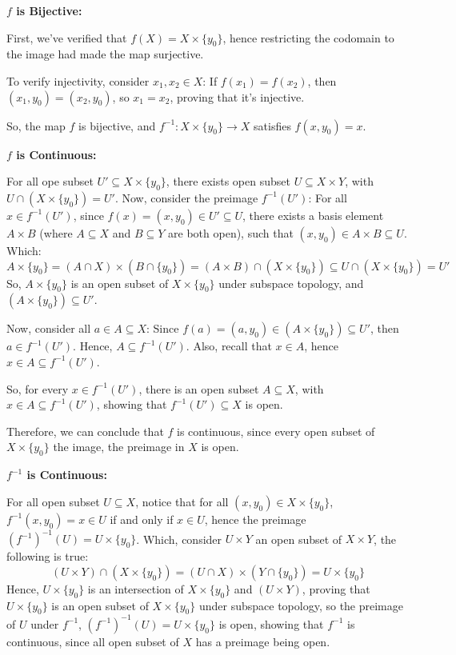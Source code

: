 \documentclass{article}
\begin{document}
\hfill

\textbf{$f$ is Bijective:}

First, we've verified that $f(X)=X\times \{y_0\}$, hence restricting the codomain to the image had made the map surjective.

To verify injectivity, consider $x_1,x_2 \in X$: If $f(x_1)=f(x_2)$, then $(x_1,y_0)=(x_2,y_0)$, so $x_1=x_2$, proving that it's injective.

So, the map $f$ is bijective, and $f^{-1}:X\times \{y_0\}\rightarrow X$ satisfies $f(x,y_0)=x$.

\hfill

\textbf{$f$ is Continuous:}

For all ope subset $U'\subseteq X\times \{y_0\}$, there exists open subset $U\subseteq X\times Y$, with $U\cap (X\times \{y_0\}) = U'$.
Now, consider the preimage $f^{-1}(U')$: For all $x\in f^{-1}(U')$, since $f(x)=(x,y_0)\in U' \subseteq U$, there exists a basis element $A\times B$ 
(where $A\subseteq X$ and $B\subseteq Y$ are both open), such that $(x,y_0)\in A\times B \subseteq U$.
Which:
$$A\times \{y_0\} = (A\cap X)\times (B\cap \{y_0\}) = (A\times B)\cap (X\times \{y_0\}) \subseteq U\cap (X\times \{y_0\})=U'$$
So, $A\times \{y_0\}$ is an open subset of $X\times \{y_0\}$ under subspace topology, and $(A\times \{y_0\})\subseteq U'$.

Now, consider all $a\in A\subseteq X$: Since $f(a)=(a,y_0)\in (A\times \{y_0\})\subseteq U'$, then $a\in f^{-1}(U')$.
Hence, $A\subseteq f^{-1}(U')$. Also, recall that $x\in A$, hence $x\in A \subseteq f^{-1}(U')$. 

So, for every $x\in f^{-1}(U')$, there is an open subset $A\subseteq X$, with $x\in A\subseteq f^{-1}(U')$, showing that $f^{-1}(U')\subseteq X$ is open.

Therefore, we can conclude that $f$ is continuous, since every open subset of $X\times \{y_0\}$ the image, the preimage in $X$ is open.

\hfill

\textbf{$f^{-1}$ is Continuous:}

For all open subset $U\subseteq X$, notice that for all $(x,y_0)\in X\times \{y_0\}$, $f^{-1}(x,y_0)=x\in U$ if and only if $x\in U$,
hence the preimage $(f^{-1})^{-1}(U) = U\times \{y_0\}$. Which, consider $U\times Y$ an open subset of $X\times Y$, the following is true:
$$(U\times Y)\cap (X\times \{y_0\}) = (U\cap X)\times (Y\cap \{y_0\}) = U\times \{y_0\}$$
Hence, $U\times \{y_0\}$ is an intersection of $X\times \{y_0\}$ and $(U\times Y)$, proving that $U\times \{y_0\}$ is an open subset of $X\times \{y_0\}$ under subspace topology,
so the preimage of $U$ under $f^{-1}$, $(f^{-1})^{-1}(U) = U\times \{y_0\}$ is open, showing that $f^{-1}$ is continuous, since all open subset of $X$ has a preimage being open.
\end{document}
